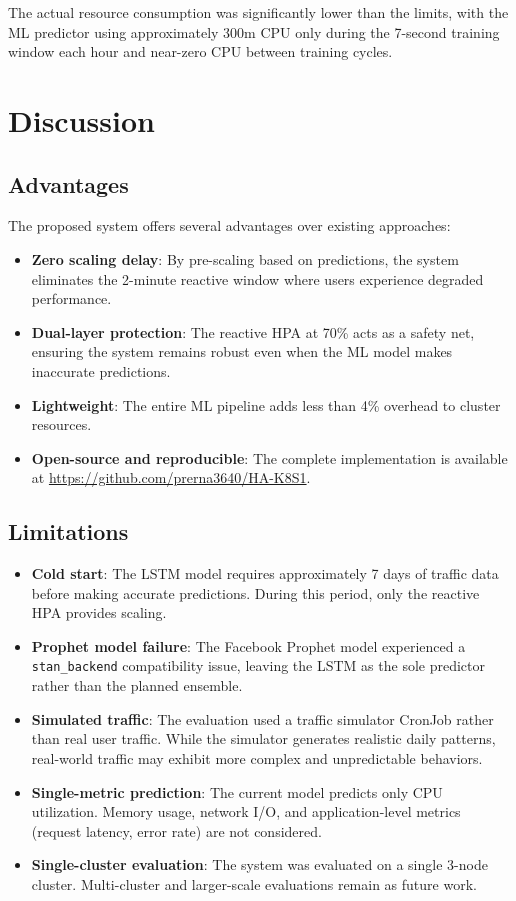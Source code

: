 \documentclass[journal]{IEEEtran}
\begin{document}
The actual resource consumption was significantly lower than the limits, with the ML predictor using approximately 300m CPU only during the 7-second training window each hour and near-zero CPU between training cycles.

\section{Discussion}
\label{sec:discussion}

\subsection{Advantages}
The proposed system offers several advantages over existing approaches:
\begin{itemize}
    \item \textbf{Zero scaling delay}: By pre-scaling based on predictions, the system eliminates the 2-minute reactive window where users experience degraded performance.
    \item \textbf{Dual-layer protection}: The reactive HPA at 70\% acts as a safety net, ensuring the system remains robust even when the ML model makes inaccurate predictions.
    \item \textbf{Lightweight}: The entire ML pipeline adds less than 4\% overhead to cluster resources.
    \item \textbf{Open-source and reproducible}: The complete implementation is available at \url{https://github.com/prerna3640/HA-K8S1}.
\end{itemize}

\subsection{Limitations}
\begin{itemize}
    \item \textbf{Cold start}: The LSTM model requires approximately 7 days of traffic data before making accurate predictions. During this period, only the reactive HPA provides scaling.
    \item \textbf{Prophet model failure}: The Facebook Prophet model experienced a \texttt{stan\_backend} compatibility issue, leaving the LSTM as the sole predictor rather than the planned ensemble.
    \item \textbf{Simulated traffic}: The evaluation used a traffic simulator CronJob rather than real user traffic. While the simulator generates realistic daily patterns, real-world traffic may exhibit more complex and unpredictable behaviors.
    \item \textbf{Single-metric prediction}: The current model predicts only CPU utilization. Memory usage, network I/O, and application-level metrics (request latency, error rate) are not considered.
    \item \textbf{Single-cluster evaluation}: The system was evaluated on a single 3-node cluster. Multi-cluster and larger-scale evaluations remain as future work.
\end{itemize}
\end{document}
